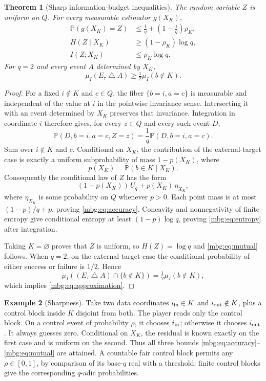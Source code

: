 \documentclass[11pt,letterpaper]{article}
\newtheorem{theorem}{Theorem}[section]
\theoremstyle{definition}
\newtheorem{example}[theorem]{Example}
\newcommand{\Prb}{\mathbb P}
\begin{document}
\begin{theorem}[Sharp information-budget inequalities]
\label{mbg:thm:information}
The random variable $Z$ is uniform on $Q$. For every measurable estimator $g(X_K)$,
\begin{align}
 \Prb(g(X_K)=Z)&\le\frac1q+\left(1-\frac1q\right)\rho_K,
 \label{mbg:eq:accuracy}\\
 H(Z\mid X_K)&\ge(1-\rho_K)\log q,
 \label{mbg:eq:entropy}\\
 I(Z;X_K)&\le\rho_K\log q.
 \label{mbg:eq:mutual}
\end{align}
For $q=2$ and every event $A$ determined by $X_K$,
\begin{equation}
 \mu_I(E_\tau\mathbin\triangle A)\ge\tfrac12\mu_I(b\notin K).
 \label{mbg:eq:approximation}
\end{equation}
\end{theorem}
\begin{proof}
For a fixed $i\notin K$ and $c\in Q$, the fiber $\{b=i,a=c\}$ is measurable and independent of the value at $i$ in the pointwise invariance sense. Intersecting it with an event determined by $X_K$ preserves that invariance. Integration in coordinate $i$ therefore gives, for every $z\in Q$ and every such event $D$,
\[
 \Prb(D,b=i,a=c,Z=z)=\frac1q\Prb(D,b=i,a=c).
\]
Sum over $i\notin K$ and $c$. Conditional on $X_K$, the contribution of the external-target case is exactly a uniform subprobability of mass $1-p(X_K)$, where
\[
 p(X_K)=\Prb(b\in K\mid X_K).
\]
Consequently the conditional law of $Z$ has the form
\[
 (1-p(X_K))\,U_q+p(X_K)\,\eta_{X_K},
\]
where $\eta_{X_K}$ is some probability on $Q$ whenever $p>0$. Each point mass is at most $(1-p)/q+p$, proving \eqref{mbg:eq:accuracy}. Concavity and nonnegativity of finite entropy give conditional entropy at least $(1-p)\log q$, proving \eqref{mbg:eq:entropy} after integration.

Taking $K=\varnothing$ proves that $Z$ is uniform, so $H(Z)=\log q$ and \eqref{mbg:eq:mutual} follows. When $q=2$, on the external-target case the conditional probability of either success or failure is $1/2$. Hence
\[
 \mu_I((E_\tau\mathbin\triangle A)\cap\{b\notin K\})
       =\tfrac12\mu_I(b\notin K),
\]
which implies \eqref{mbg:eq:approximation}.
\end{proof}

\begin{example}[Sharpness]
Take two data coordinates $i_{\rm in}\in K$ and $i_{\rm out}\notin K$, plus a control block inside $K$ disjoint from both. The player reads only the control block. On a control event of probability $\rho$, it chooses $i_{\rm in}$; otherwise it chooses $i_{\rm out}$. It always guesses zero. Conditional on $X_K$, the residual is known exactly on the first case and is uniform on the second. Thus all three bounds \eqref{mbg:eq:accuracy}--\eqref{mbg:eq:mutual} are attained. A countable fair control block permits any $\rho\in[0,1]$, by comparison of its base-$q$ real with a threshold; finite control blocks give the corresponding $q$-adic probabilities.
\end{example}
\end{document}
